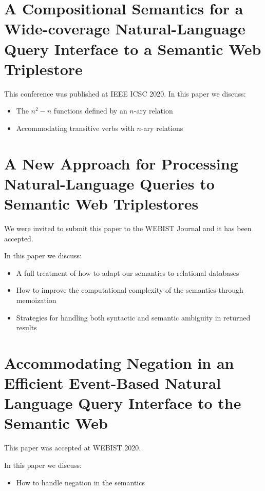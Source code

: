 \documentclass[../main.tex]{subfiles}
\begin{document}
\begin{refsection}
\section{A Compositional Semantics for a Wide-coverage Natural-Language Query Interface to a Semantic Web Triplestore}

This conference was published at IEEE ICSC 2020.  In this paper we discuss:

\begin{itemize}
    \item The $n^2 - n$ functions defined by an $n$-ary relation
    \item Accommodating transitive verbs with $n$-ary relations
\end{itemize}


\section{A New Approach for Processing Natural-Language Queries to Semantic Web Triplestores}


We were invited to submit this paper to the WEBIST Journal and it has been accepted.

In this paper we discuss:

\begin{itemize}
    \item A full treatment of how to adapt our semantics to relational databases
    \item How to improve the computational complexity of the semantics through memoization
    \item Strategies for handling both syntactic and semantic ambiguity in returned results
\end{itemize}

\section{Accommodating Negation in an Efficient Event-Based Natural Language Query Interface to the Semantic Web}


This paper was accepted at WEBIST 2020.

In this paper we discuss:

\begin{itemize}
    \item How to handle negation in the semantics
\end{itemize}


\printbibliography[heading=subbibintoc]
\end{refsection}
\end{document}
